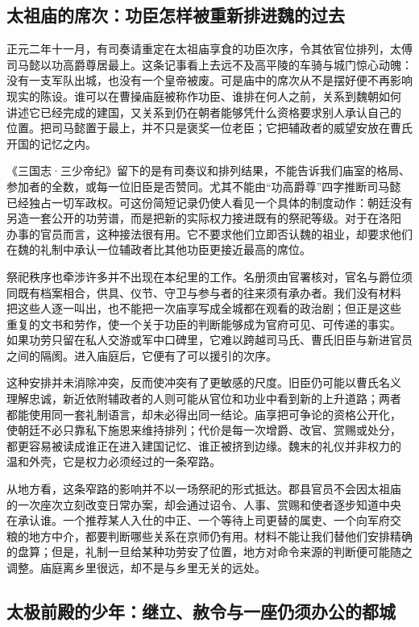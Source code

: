 \subsection{太祖庙的席次：功臣怎样被重新排进魏的过去}

正元二年十一月，有司奏请重定在太祖庙享食的功臣次序，令其依官位排列，太傅
司马懿以功高爵尊居最上。这条记事看上去远不及高平陵的车骑与城门惊心动魄：
没有一支军队出城，也没有一个皇帝被废。可是庙中的席次从不是摆好便不再影响
现实的陈设。谁可以在曹操庙庭被称作功臣、谁排在何人之前，关系到魏朝如何
讲述它已经完成的建国，又关系到仍在朝者能够凭什么资格要求别人承认自己的
位置。把司马懿置于最上，并不只是褒奖一位老臣；它把辅政者的威望安放在曹氏
开国的记忆之内。

《三国志·三少帝纪》留下的是有司奏议和排列结果，不能告诉我们庙室的格局、
参加者的全数，或每一位旧臣是否赞同。尤其不能由“功高爵尊”四字推断司马懿
已经独占一切军政权。可这份简短记录仍使人看见一个具体的制度动作：朝廷没有
另造一套公开的功劳谱，而是把新的实际权力接进既有的祭祀等级。对于在洛阳
办事的官员而言，这种接法很有用。它不要求他们立即否认魏的祖业，却要求他们
在魏的礼制中承认一位辅政者比其他功臣更接近最高的席位。

祭祀秩序也牵涉许多并不出现在本纪里的工作。名册须由官署核对，官名与爵位须
同既有档案相合，供具、仪节、守卫与参与者的往来须有承办者。我们没有材料
把这些人逐一叫出，也不能把一次庙享写成全城都在观看的政治剧；但正是这些
重复的文书和劳作，使一个关于功臣的判断能够成为官府可见、可传递的事实。
如果功劳只留在私人交游或军中口碑里，它难以跨越司马氏、曹氏旧臣与新进官员
之间的隔阂。进入庙庭后，它便有了可以援引的次序。

这种安排并未消除冲突，反而使冲突有了更敏感的尺度。旧臣仍可能以曹氏名义
理解忠诚，新近依附辅政者的人则可能从官位和功业中看到新的上升道路；两者
都能使用同一套礼制语言，却未必得出同一结论。庙享把可争论的资格公开化，
使朝廷不必只靠私下施恩来维持排列；代价是每一次增爵、改官、赏赐或处分，
都更容易被读成谁正在进入建国记忆、谁正被挤到边缘。魏末的礼仪并非权力的
温和外壳，它是权力必须经过的一条窄路。

从地方看，这条窄路的影响并不以一场祭祀的形式抵达。郡县官员不会因太祖庙
的一次座次立刻改变日常办案，却会通过诏令、人事、赏赐和使者逐步知道中央
在承认谁。一个推荐某人入仕的中正、一个等待上司更替的属吏、一个向军府交
粮的地方中介，都要判断哪些关系在京师仍有用。材料不能让我们替他们安排精确
的盘算；但是，礼制一旦给某种功劳安了位置，地方对命令来源的判断便可能随之
调整。庙庭离乡里很远，却不是与乡里无关的远处。

\subsection{太极前殿的少年：继立、赦令与一座仍须办公的都城}

